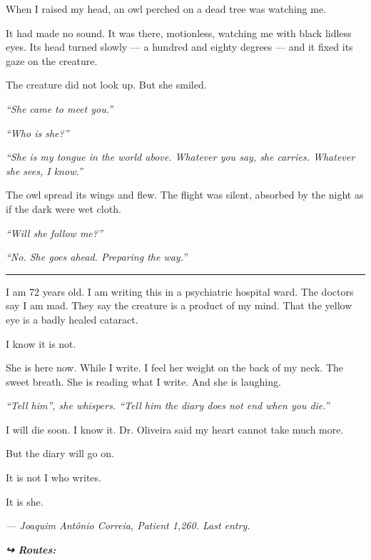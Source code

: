\noindent When I raised my head, an owl perched on a dead tree was watching me.

\noindent It had made no sound. It was there, motionless, watching me with black lidless eyes. Its head turned slowly --- a hundred and eighty degrees --- and it fixed its gaze on the creature.

\noindent The creature did not look up. But she smiled.

\noindent \textit{\textquotedblleft{}She came to meet you.\textquotedblright{}}

\noindent \textit{\textquotedblleft{}Who is she?\textquotedblright{}}

\noindent \textit{\textquotedblleft{}She is my tongue in the world above. Whatever you say, she carries. Whatever she sees, I know.\textquotedblright{}}

\noindent The owl spread its wings and flew. The flight was silent, absorbed by the night as if the dark were wet cloth.

\noindent \textit{\textquotedblleft{}Will she follow me?\textquotedblright{}}

\noindent \textit{\textquotedblleft{}No. She goes ahead. Preparing the way.\textquotedblright{}}

\vspace{0.5em}\noindent\rule{\textwidth}{0.5pt}\vspace{0.5em}

\noindent I am 72 years old. I am writing this in a psychiatric hospital ward. The doctors say I am mad. They say the creature is a product of my mind. That the yellow eye is a badly healed cataract.

\noindent I know it is not.

\noindent She is here now. While I write. I feel her weight on the back of my neck. The sweet breath. She is reading what I write. And she is laughing.

\noindent \textit{\textquotedblleft{}Tell him\textquotedblright{}\textit{, she whispers. }\textquotedblleft{}Tell him the diary does not end when you die.\textquotedblright{}}

\noindent I will die soon. I know it. Dr. Oliveira said my heart cannot take much more.

\noindent But the diary will go on.

\noindent It is not I who writes.

\noindent It is she.

\noindent \textit{--- Joaquim Antônio Correia, Patient 1,260. Last entry.}

\vspace{0.5em}
\noindent\textit{\textbf{↪ Routes:}  \rotasep {} \rotasep {}}
